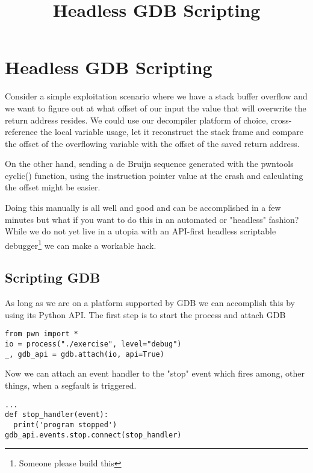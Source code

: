 \documentclass[twocolumn]{article}
\begin{document}
\title{Headless GDB Scripting}
\date{}
\section*{Headless GDB Scripting}

\vspace*{-0.5\baselineskip}

Consider a simple exploitation scenario where we have a stack buffer overflow and we want to figure out at what offset of our input the value that will overwrite the return address resides. We could use our decompiler platform of choice, cross-reference the local variable usage, let it reconstruct the stack frame and compare the offset of the overflowing variable with the offset of the saved return address.

On the other hand, sending a de Bruijn sequence generated with the pwntools cyclic() function, using the instruction pointer value at the crash and calculating the offset might be easier.

Doing this manually is all well and good and can be accomplished in a few minutes but what if you want to do this in an automated or "headless" fashion? While we do not yet live in a utopia with an API-first headless scriptable debugger\footnote{Someone please build this} we can make a workable hack.

\vspace*{-0.5\baselineskip}
\subsection*{Scripting GDB}

As long as we are on a platform supported by GDB we can accomplish this by using its Python API. The first step is to start the process and attach GDB

\begin{verbatim}
from pwn import *
io = process("./exercise", level="debug")
_, gdb_api = gdb.attach(io, api=True)
\end{verbatim}

Now we can attach an event handler to the "stop" event which fires among, other things, when a segfault is triggered.

\begin{verbatim}
...
def stop_handler(event):
  print('program stopped')
gdb_api.events.stop.connect(stop_handler)
\end{verbatim}
\end{document}
